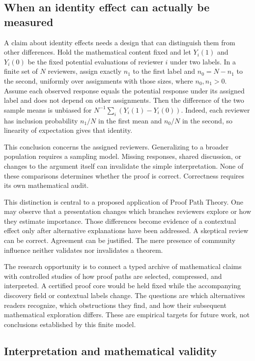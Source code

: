 \documentclass[11pt,oneside]{article}
\theoremstyle{komorebiplain}
\theoremstyle{komorebidefinition}
\theoremstyle{komorebiremark}
\begin{document}
\subsection{When an identity effect can actually be measured}

A claim about identity effects needs a design that can distinguish them from other differences. Hold the mathematical content fixed and let $Y_i(1)$ and $Y_i(0)$ be the fixed potential evaluations of reviewer $i$ under two labels. In a finite set of $N$ reviewers, assign exactly $n_1$ to the first label and $n_0=N-n_1$ to the second, uniformly over assignments with those sizes, where $n_0,n_1>0$. Assume each observed response equals the potential response under its assigned label and does not depend on other assignments. Then the difference of the two sample means is unbiased for $N^{-1}\sum_i(Y_i(1)-Y_i(0))$. Indeed, each reviewer has inclusion probability $n_1/N$ in the first mean and $n_0/N$ in the second, so linearity of expectation gives that identity.

This conclusion concerns the assigned reviewers. Generalizing to a broader population requires a sampling model. Missing responses, shared discussion, or changes to the argument itself can invalidate the simple interpretation. None of these comparisons determines whether the proof is correct. Correctness requires its own mathematical audit.

This distinction is central to a proposed application of Proof Path Theory. One may observe that a presentation changes which branches reviewers explore or how they estimate importance. Those differences become evidence of a contextual effect only after alternative explanations have been addressed. A skeptical review can be correct. Agreement can be justified. The mere presence of community influence neither validates nor invalidates a theorem.

The research opportunity is to connect a typed archive of mathematical claims with controlled studies of how proof paths are selected, compressed, and interpreted. A certified proof core would be held fixed while the accompanying discovery field or contextual labels change. The questions are which alternatives readers recognize, which obstructions they find, and how their subsequent mathematical exploration differs. These are empirical targets for future work, not conclusions established by this finite model.

\subsection{Interpretation and mathematical validity}
\end{document}
